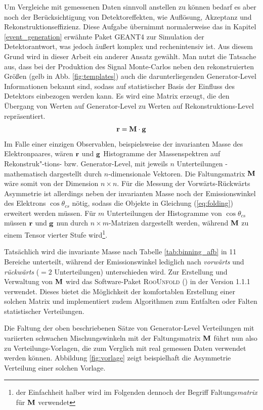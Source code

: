 Um Vergleiche mit gemessenen Daten sinnvoll anstellen zu können bedarf es
aber noch der Berücksichtigung von Detektoreffekten, wie Auflösung, Akzeptanz
und Rekonstruktionseffizienz. Diese Aufgabe übernimmt normalerweise das in
Kapitel \ref{event_generation} erwähnte Paket \textsc{GEANT4} zur Simulation
der Detektorantwort, was jedoch äußert komplex und rechenintensiv ist. Aus
diesem Grund wird in dieser Arbeit ein anderer Ansatz gewählt. Man nutzt die
Tatsache aus, dass bei der Produktion des Signal Monte-Carlos neben den
rekonstruierten Größen (gelb in Abb. \ref{fig:templates}) auch die
darunterliegenden Generator-Level Informationen bekannt sind, sodass auf
statistischer Basis der Einfluss des Detektors einbezogen werden kann. Es wird
eine Matrix erzeugt, die den Übergang von Werten auf Generator-Level zu Werten
auf Rekonstruktions-Level repräsentiert.
\begin{equation}
    \bf r = M \cdot \bf{g}
    \label{eq:folding}
\end{equation}
Im Falle einer einzigen Observablen, beispielsweise der invarianten Masse des
Elektronpaares, wären $\bf{r}$ und $\bf{g}$ Histogramme der Massenspektren auf
Rekonstruk"-tions- bzw. Generator-Level, mit jeweils $n$ Unterteilungen -
mathematisch dargestellt durch $n$-dimensionale Vektoren. Die Faltungsmatrix
$\bf{M}$ wäre somit von der Dimension $n \times n$. Für die Messung der
Vorwärts-Rückwärts Asymmetrie ist allerdings neben der invarianten Masse noch
der Emissionswinkel des Elektrons $\cos\theta_{cs}$ nötig, sodass die Objekte
in Gleichung (\ref{eq:folding}) erweitert werden müssen. Für $m$ Unterteilungen
der Histogramme von $\cos\theta_{cs}$ müssen $\bf{r}$ und $\bf{g}$ nun durch 
$n \times m$-Matrizen dargestellt werden, während $\bf{M}$ zu einem Tensor
vierter Stufe wird\footnote{der Einfachheit halber wird im Folgenden dennoch
der Begriff Faltungs\textit{matrix} für $\bf{M}$ verwendet}.

Tatsächlich wird die invariante Masse nach Tabelle \ref{tab:binning_afb} in 11
Bereiche unterteilt, während der Emissionswinkel lediglich nach
\textit{vorwärts} und \textit{rückwärts} ($=2$ Unterteilungen) unterschieden
wird. Zur Erstellung und Verwaltung von $\bf{M}$ wird das Software-Paket
\textsc{RooUnfold} (\cite{2011arXiv1105.1160A}) in der Version 1.1.1 verwendet.
Dieses bietet die Möglichkeit der komfortablen Erstellung einer solchen Matrix
und implementiert zudem Algorithmen zum Entfalten oder Falten statistischer
Verteilungen.

Die Faltung der oben beschriebenen Sätze von Generator-Level Verteilungen mit
variierten schwachen Mischungswinkeln mit der Faltungsmatrix $\bf{M}$ führt nun
also zu Verteilungs-Vorlagen, die zum Verglich mit real gemessen Daten
verwendet werden können. Abbildung \ref{fig:vorlage} zeigt beispielhaft die
Asymmetrie Verteilung einer solchen Vorlage.

